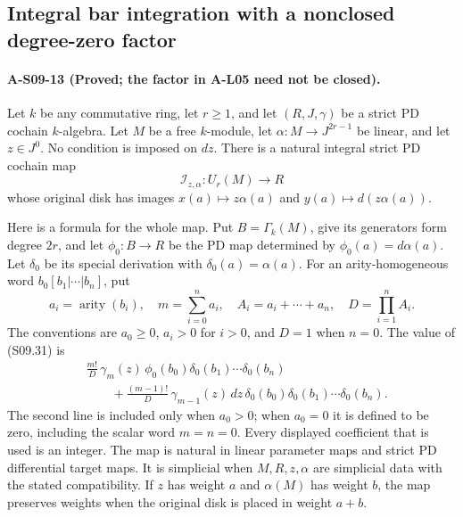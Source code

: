 \subsection{Integral bar integration with a nonclosed degree-zero factor}

\paragraph{A-S09-13 (Proved; the factor in A-L05 need not be closed).}
Let $k$ be any commutative ring, let $r\geq1$, and let
$(R,J,\gamma)$ be a strict PD cochain $k$-algebra.
Let $M$ be a free $k$-module, let
$\alpha:M\to J^{2r-1}$ be linear, and let $z\in J^0$.
No condition is imposed on $dz$.
There is a natural integral strict PD cochain map
\[
       \mathcal I_{z,\alpha}:U_r(M)\longrightarrow R
 \tag{S09.31}
\]
whose original disk has images
$x(a)\mapsto z\alpha(a)$ and
$y(a)\mapsto d(z\alpha(a))$.

Here is a formula for the whole map.  Put $B=\Gamma_k(M)$,
give its generators form degree $2r$, and let
$\phi_0:B\to R$ be the PD map determined by
$\phi_0(a)=d\alpha(a)$.  Let $\delta_0$ be its special
derivation with $\delta_0(a)=\alpha(a)$.
For an arity-homogeneous word $b_0[b_1|\cdots|b_n]$, put
\[
 a_i=\operatorname{arity}(b_i),\quad
 m=\sum_{i=0}^na_i,\quad
 A_i=a_i+\cdots+a_n,\quad D=\prod_{i=1}^n A_i.
\]
The conventions are $a_0\geq0$, $a_i>0$ for $i>0$,
and $D=1$ when $n=0$.  The value of (S09.31) is
\[
\begin{split}
 &\frac{m!}{D}\,\gamma_m(z)\,
       \phi_0(b_0)\delta_0(b_1)\cdots\delta_0(b_n)\\
 &\qquad+
 \frac{(m-1)!}{D}\,\gamma_{m-1}(z)\,dz\,
       \delta_0(b_0)\delta_0(b_1)\cdots\delta_0(b_n).
\end{split}
\tag{S09.32}
\]
The second line is included only when $a_0>0$; when
$a_0=0$ it is defined to be zero, including the scalar
word $m=n=0$.  Every displayed coefficient that is used
is an integer.  The map is natural in linear parameter
maps and strict PD differential target maps.  It is
simplicial when $M,R,z,\alpha$ are simplicial data with
the stated compatibility.  If $z$ has weight $a$ and
$\alpha(M)$ has weight $b$, the map preserves weights
when the original disk is placed in weight $a+b$.

